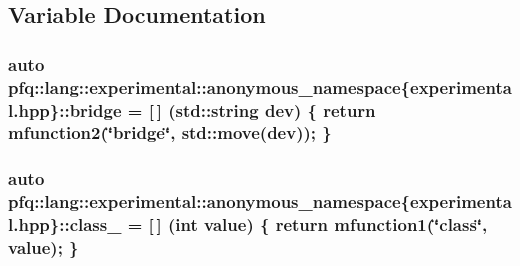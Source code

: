 \subsection{Variable Documentation}
\hypertarget{namespacepfq_1_1lang_1_1experimental_1_1anonymous__namespace_02experimental_8hpp_03_a03fc8960a5fbbe59f000bd9c5a74b7fe}{
\subsubsection[{bridge}]{\setlength{\rightskip}{0pt plus 5cm}auto pfq\+::lang\+::experimental\+::anonymous\+\_\+namespace\{experimental.\+hpp\}\+::bridge = \mbox{[}$\,$\mbox{]} (std\+::string dev) \{ return {\bf mfunction2}(\char`\"{}bridge\char`\"{}, std\+::move(dev)); \}}}\label{namespacepfq_1_1lang_1_1experimental_1_1anonymous__namespace_02experimental_8hpp_03_a03fc8960a5fbbe59f000bd9c5a74b7fe}
\hypertarget{namespacepfq_1_1lang_1_1experimental_1_1anonymous__namespace_02experimental_8hpp_03_a55ce0b220b42a47460d1d40d3d5fdd5d}{
\subsubsection[{class\+\_\+}]{\setlength{\rightskip}{0pt plus 5cm}auto pfq\+::lang\+::experimental\+::anonymous\+\_\+namespace\{experimental.\+hpp\}\+::class\+\_\+ = \mbox{[}$\,$\mbox{]} (int value) \{ return {\bf mfunction1}(\char`\"{}class\char`\"{}, value); \}}}\label{namespacepfq_1_1lang_1_1experimental_1_1anonymous__namespace_02experimental_8hpp_03_a55ce0b220b42a47460d1d40d3d5fdd5d}
